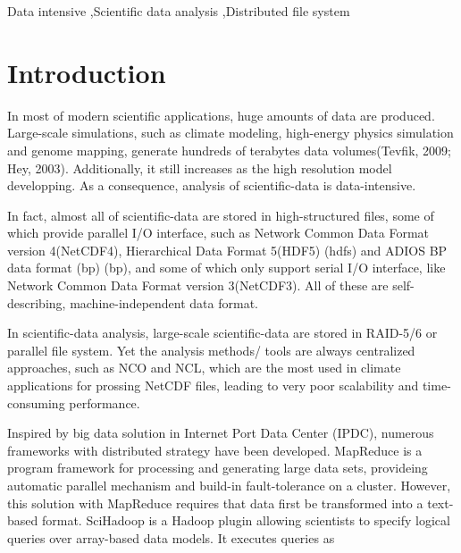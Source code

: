 \documentclass[preprint,12pt]{elsarticle}
\begin{document}
\begin{frontmatter}
\begin{keyword}


Data intensive \sep Scientific data analysis \sep Distributed file system
\end{keyword}

\end{frontmatter}

\linenumbers

\section{Introduction}
In most of modern scientific applications, huge amounts of data are produced. Large-scale simulations, such as climate modeling,
high-energy physics simulation and genome mapping, generate hundreds of terabytes data volumes(Tevfik, 2009; Hey, 2003). 
Additionally, it still increases as the high resolution model developping. As a consequence, analysis of scientific-data is 
data-intensive.\par
In fact, almost all of scientific-data are stored in high-structured files, some of which provide parallel I/O interface, such as
Network Common Data Format version 4(NetCDF4), Hierarchical Data Format 5(HDF5) (hdfs) and ADIOS BP data format (bp) (bp), and some
of which only support serial I/O interface,  like Network Common Data Format version 3(NetCDF3). All of these are self-describing,
machine-independent data format. \par
In scientific-data analysis, large-scale scientific-data are stored in RAID-5/6 or parallel file system. Yet the analysis methods/
tools are always centralized approaches, such as NCO and NCL, which are the most used in climate applications for prossing NetCDF
files, leading to very poor scalability and time-consuming performance. \par    
Inspired by big data solution in Internet Port Data Center (IPDC), numerous frameworks with distributed strategy have been developed.
MapReduce is a program framework for processing and generating large data sets, provideing automatic parallel mechanism and build-in
fault-tolerance on a cluster. However, this solution with MapReduce requires that data first be transformed into a text-based format.
SciHadoop is a Hadoop plugin allowing scientists to specify logical queries over array-based data models. It executes queries as
\end{document}
